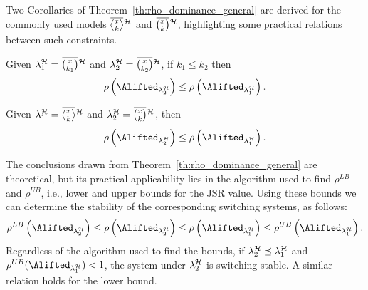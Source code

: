 Two Corollaries of Theorem~\ref{th:rho_dominance_general} are derived for the commonly used models $\erowmiss{}{\strat}$ and $\eanymiss{}{\strat}$, highlighting some practical relations between such constraints.
\begin{corollary}%
    \label{cor:rho_dominance_mk}%
    Given $\lambda^\strat_1 = \overbar{\binom{x}{k_1}}^{\strat}$ and $\lambda^\strat_2 = \overbar{\binom{x}{k_2}}^{\strat}$, if $k_1 \leq k_2$ then
    $$
        \rho\funof{\Alifted_{\lambda^\strat_2}} \leq \rho\funof{\Alifted_{\lambda^\strat_1}}.
    $$
\end{corollary}
\begin{corollary}%
    \label{cor:rho_dominance_cons}%
    Given $\lambda^\strat_1 = \erowmiss{}{\strat}$ and $\lambda^\strat_2 = \eanymiss{}{\strat}$, then
    $$
        \rho\funof{\Alifted_{\lambda^\strat_2}} \leq \rho\funof{\Alifted_{\lambda^\strat_1}}.
    $$
\end{corollary}
%
The conclusions drawn from Theorem~\ref{th:rho_dominance_general} are theoretical, but its practical applicability lies in the algorithm used to find $\rho^{LB}$ and $\rho^{UB}$, i.e., lower and upper bounds for the JSR value.
Using these bounds we can determine the stability of the corresponding switching systems, as follows:
%
$$
\rho^{LB} \funof{ \Alifted_{\lambda^\strat_2} } \leq \rho \funof{ \Alifted_{\lambda^\strat_2} } \leq \rho \funof{ \Alifted_{\lambda^\strat_1} } \leq \rho^{UB} \funof{ \Alifted_{\lambda^\strat_1} }.
$$
%
Regardless of the algorithm used to find the bounds, if $\lambda^{\mathcal{H}}_2 \preceq \lambda^{\mathcal{H}}_1$ and $\rho^{UB} ( \Alifted_{\lambda^\strat_1} ) < 1$, the system under $\lambda^{\mathcal{H}}_2$ is switching stable.
A similar relation holds for the lower bound.

